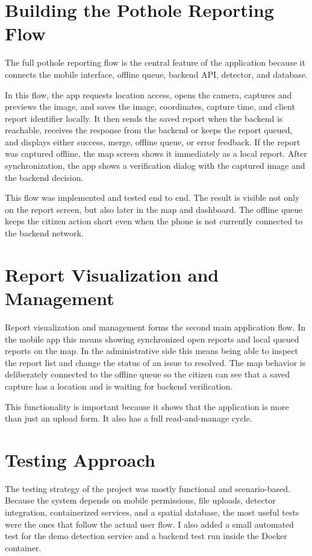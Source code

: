 \section{Building the Pothole Reporting Flow}

The full pothole reporting flow is the central feature of the application because it connects the mobile interface, offline queue, backend API, detector, and database.

In this flow, the app requests location access, opens the camera, captures and previews the image, and saves the image, coordinates, capture time, and client report identifier locally. It then sends the saved report when the backend is reachable, receives the response from the backend or keeps the report queued, and displays either success, merge, offline queue, or error feedback. If the report was captured offline, the map screen shows it immediately as a local report. After synchronization, the app shows a verification dialog with the captured image and the backend decision.

This flow was implemented and tested end to end. The result is visible not only on the report screen, but also later in the map and dashboard. The offline queue keeps the citizen action short even when the phone is not currently connected to the backend network.

\section{Report Visualization and Management}

Report visualization and management forms the second main application flow. In the mobile app this means showing synchronized open reports and local queued reports on the map. In the administrative side this means being able to inspect the report list and change the status of an issue to resolved. The map behavior is deliberately connected to the offline queue so the citizen can see that a saved capture has a location and is waiting for backend verification.

This functionality is important because it shows that the application is more than just an upload form. It also has a full read-and-manage cycle.

\section{Testing Approach}

The testing strategy of the project was mostly functional and scenario-based. Because the system depends on mobile permissions, file uploads, detector integration, containerized services, and a spatial database, the most useful tests were the ones that follow the actual user flow. I also added a small automated test for the demo detection service and a backend test run inside the Docker container.

